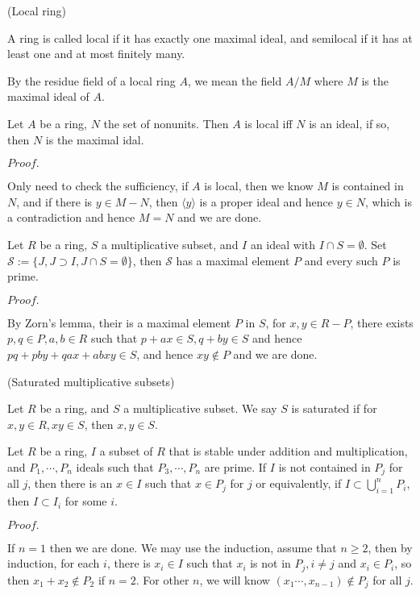 \documentclass{article}
\newcommand{\Pf}[1]{$Proof.$\par}
\begin{document}
\begin{definition}
    (Local ring)\par
    A ring is called local if it has exactly one maximal ideal, and semilocal if it has at least one and at most finitely many.\par
    By the residue field of a local ring $A$, we mean the field $A/M$ where $M$ is the maximal ideal of $A$.
\end{definition}

\begin{lemma}
    Let $A$ be a ring, $N$ the set of nonunits. Then $A$ is local iff $N$ is an ideal, if so, then $N$ is the maximal idal.
\end{lemma}
\Pf\par
    Only need to check the sufficiency, if $A$ is local, then we know $M$ is contained in $N$, and if there is $y\in M-N$, then $\langle y\rangle$ is a proper ideal and hence $y\in N$, which is a contradiction and hence $M=N$ and we are done.

\begin{proposition}
    Let $R$ be a ring, $S$ a multiplicative subset, and $I$ an ideal with $I\cap S = \emptyset$. Set $\mathcal{S} :=\{J,J\supset I, J\cap S = \emptyset\}$, then $\mathcal{S}$ has a maximal element $P$ and every such $P$ is prime.
\end{proposition}
\Pf\par
    By Zorn's lemma, their is a maximal element $P$ in $S$, for $x,y \in R - P$, there  exists $p,q\in P, a,b\in R$ such that $p+ax\in S, q+by \in S$ and hence $pq+pby+qax+abxy \in S$, and hence $xy\notin P$ and we are done.

\begin{definition}
    (Saturated multiplicative subsets)\par
    Let $R$ be a ring, and $S$ a multiplicative subset. We say $S$ is saturated if for $x,y\in R, xy\in S$, then $x,y\in S$.
\end{definition}

\begin{lemma}
    Let $R$ be a ring, $I$ a subset of $R$ that is stable under addition and multiplication, and $P_1,\cdots,P_n$ ideals such that $P_3,\cdots,P_n$ are prime. If $I$ is not contained in $P_j$ for all $j$, then there is an $x\in I$ such that $x\in P_j$ for $j$ or equivalently, if $I\subset \bigcup_{i=1}^n P_i$, then $I\subset I_i$ for some $i$.
\end{lemma}
\Pf\par
    If $n=1$ then we are done. We may use the induction, assume that $n\geq 2$, then by induction, for each $i$, there is $x_i\in I$ such that $x_i$ is not in $P_j, i\neq j$ and $x_i\in P_i$, so then $x_1+x_2\notin P_2$ if $n=2$. For other $n$, we will know $(x_1\cdots,x_{n-1})\notin P_j$ for all $j$.
\end{document}
